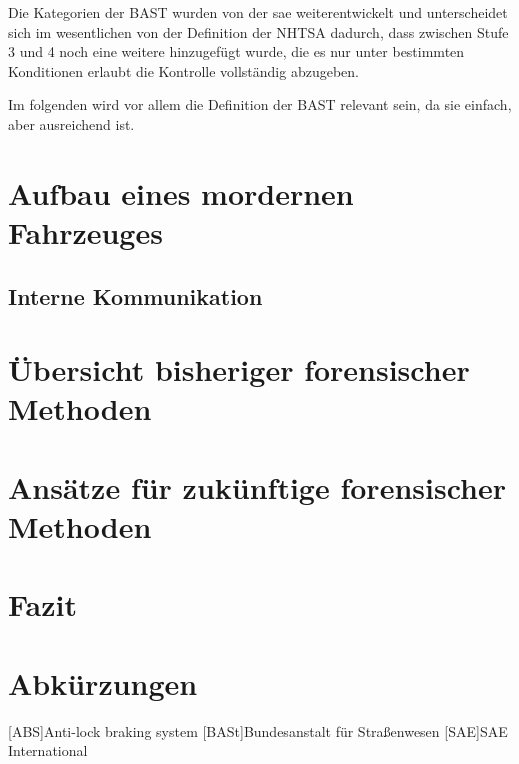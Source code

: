 \documentclass[conference,compsoc,final,a4paper]{IEEEtran}
\begin{document}
Die Kategorien der \ac{BAST} wurden von der \ac{sae} weiterentwickelt \cite{bast2021} und unterscheidet sich im wesentlichen von der Definition der \ac{NHTSA} dadurch, dass zwischen Stufe 3 und 4 noch eine weitere hinzugefügt wurde, die es nur unter bestimmten Konditionen erlaubt die Kontrolle vollständig abzugeben\cite{SAE2021}.

Im folgenden wird vor allem die Definition der \ac{BAST} relevant sein, da sie einfach, aber ausreichend ist.

\section{Aufbau eines mordernen Fahrzeuges}

\subsection{Interne Kommunikation}

\section{Übersicht bisheriger forensischer Methoden}
\section{Ansätze für zukünftige forensischer Methoden}
\section{Fazit}
\section*{Abkürzungen}

\begin{acronym}[IEEE]
  [ABS]{Anti-lock braking system}
  [BASt]{Bundesanstalt für Straßenwesen}
  [SAE]{SAE International}
\end{acronym}

\printbibliography
\end{document}
